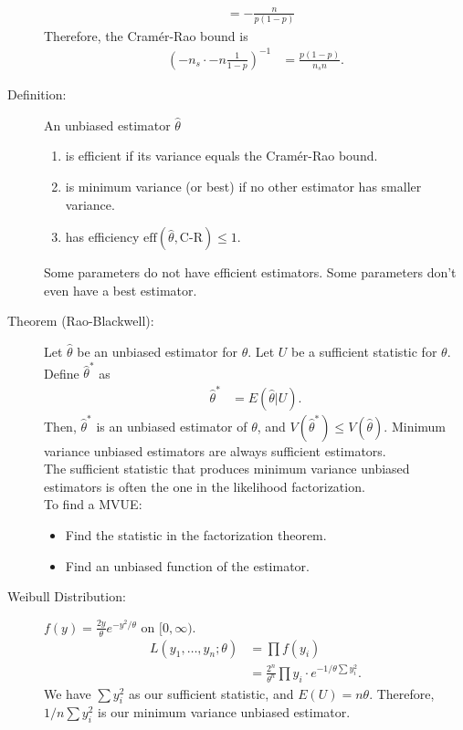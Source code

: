 \documentclass[10pt]{extarticle}
\begin{document}
\begin{description}
\begin{align*}
                                                                  &= -\frac{n}{p(1-p)}
      \end{align*}
      Therefore, the Cramér-Rao bound is
      \begin{align*}
        \left(-n_{s}\cdot-n\frac{1}{1-p}\right)^{-1} &= \frac{p(1-p)}{n_{s}n}.
      \end{align*}
    \item[Definition:] An unbiased estimator $\hat{\theta}$
      \begin{enumerate}[(1)]
        \item is efficient if its variance equals the Cramér-Rao bound.
        \item is minimum variance (or best) if no other estimator has smaller variance.
        \item has efficiency $\text{eff}(\hat{\theta},\text{C-R}) \leq 1$.
      \end{enumerate}
      Some parameters do not have efficient estimators. Some parameters don't even have a best estimator.
    \item[Theorem (Rao-Blackwell):] Let $\hat{\theta}$ be an unbiased estimator for $\theta$. Let $U$ be a sufficient statistic for $\theta$. Define $\hat{\theta}^{\ast}$ as
      \begin{align*}
        \hat{\theta}^{\ast} &= E(\hat{\theta}|U).
      \end{align*}
      Then, $\hat{\theta}^{\ast}$ is an unbiased estimator of $\theta$, and $V(\hat{\theta}^{\ast}) \leq V(\hat{\theta})$. Minimum variance unbiased estimators are always sufficient estimators.\\

      The sufficient statistic that produces minimum variance unbiased estimators is often the one in the likelihood factorization.\\

      To find a MVUE:
      \begin{itemize}
        \item Find the statistic in the factorization theorem.
        \item Find an unbiased function of the estimator.
      \end{itemize}
    \item[Weibull Distribution:] $f(y) = \frac{2y}{\theta}e^{-y^2/\theta}$ on $[0,\infty)$.
      \begin{align*}
        L(y_1,\dots,y_n;\theta) &= \prod f(y_i)\\
                                &= \frac{2^n}{\theta^n} \prod y_i \cdot e^{-1/\theta \sum y_i^2}.
      \end{align*}
      We have $\sum y_i^2$ as our sufficient statistic, and $E(U) = n\theta$. Therefore, $1/n\sum y_i^2$ is our minimum variance unbiased estimator.
  \end{description}
\end{document}
